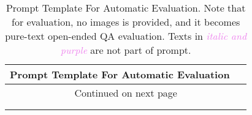 
\begin{longtable}{p{0.95\linewidth}}
\label{tab:prompt_eval}\\

\toprule[2pt]
\textbf{Prompt Template For Automatic Evaluation}\\ \midrule
\endfirsthead

\midrule
\endhead

\hline \multicolumn{1}{c}{{Continued on next page}} \\ \hline
\endfoot

\bottomrule\\[-0.8em]
\caption{Prompt Template For Automatic Evaluation. Note that for evaluation, no images is provided, and it becomes pure-text open-ended QA evaluation. Texts in \textit{\textcolor{violet}{italic and purple}} are not part of prompt.}
\endlastfoot


\end{longtable}
